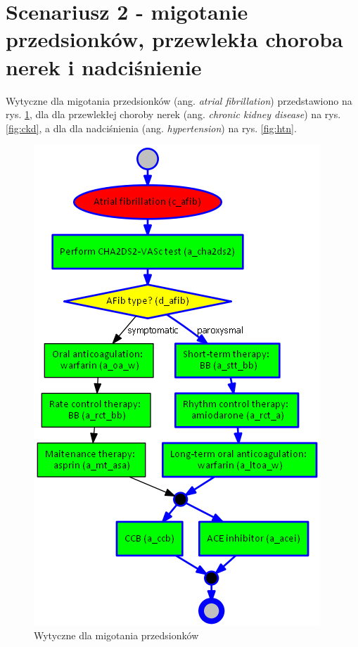 \section{Scenariusz 2 - migotanie przedsionków, przewlekła choroba nerek i nadciśnienie}
Wytyczne dla migotania przedsionków (ang. \textit{atrial fibrillation}) przedstawiono na rys. \ref{fig:afib}, dla dla przewlekłej choroby nerek (ang. \textit{chronic kidney disease}) na rys. \ref{fig:ckd}, a dla dla nadciśnienia (ang. \textit{hypertension}) na rys. \ref{fig:htn}.

\begin{figure}[H]
\centering
\includegraphics[scale=0.45]{img/afib-ver-4.png}
\caption{Wytyczne dla migotania przedsionków}
\label{fig:afib}
\end{figure}


